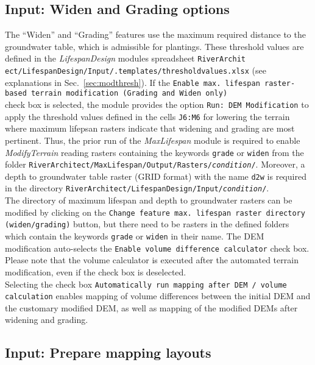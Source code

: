 \subsection{Input: Widen and Grading options}\label{sec:mtdemmod}
The ``Widen'' and ``Grading'' features use the maximum required distance to the groundwater table, which is admissible for plantings. These threshold values are defined in the \textit{LifespanDesign} modules spreadsheet \texttt{RiverArchit ect/LifespanDesign/Input/.templates/threshold{\myUnderscore}values.xlsx} (see explanations in Sec.~\ref{sec:modthresh}). If the \texttt{Enable max. lifespan raster-based terrain modification (Grading and Widen only)}\\ check box is selected, the module provides the option \texttt{Run: DEM Modification} to apply the threshold values defined in the cells \texttt{J6:M6} for lowering the terrain where maximum lifepsan rasters indicate that widening and grading are most pertinent. Thus, the prior run of the \textit{MaxLifespan} module is required to enable \textit{ModifyTerrain} reading rasters containing the keywords \texttt{grade} or \texttt{widen} from the folder \texttt{RiverArchitect/MaxLifespan/Output/Rasters/\textit{condition}/}. Moreover, a depth to groundwater table raster (GRID format) with the name \texttt{d2w} is required in the directory \texttt{RiverArchitect/LifespanDesign/Input/\textit{condition}/}.\\
The directory of maximum lifespan and depth to groundwater rasters can be modified by clicking on the \texttt{Change feature max. lifespan raster directory (widen/grading)} button, but there need to be rasters in the defined folders which contain the keywords \texttt{grade} or \texttt{widen} in their name. The DEM modification auto-selects the \texttt{Enable volume difference calculator} check box. Please note that the volume calculator is executed after the automated terrain modification, even if the check box is deselected.\\
Selecting the check box \texttt{Automatically run mapping after DEM / volume calculation} enables mapping of volume differences between the initial DEM and the customary modified DEM, as well as mapping of the modified DEMs after widening and grading.

\subsection{Input: Prepare mapping layouts}\label{sec:mtlyt}

